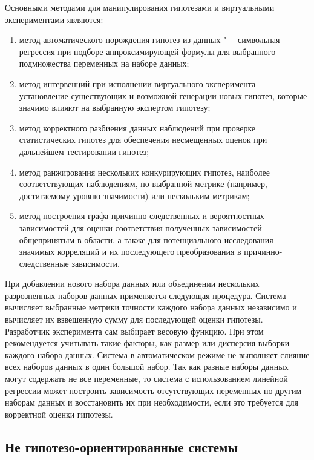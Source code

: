 Основными методами для манипулирования гипотезами и виртуальными экспериментами являются:
\begin{enumerate}
    \item метод автоматического порождения гипотез из данных "--- символьная регрессия при подборе аппроксимирующей 
            формулы для выбранного подмножества переменных на наборе данных;
    \item метод интервенций при исполнении виртуального эксперимента - установление существующих и возможной 
            генерации новых гипотез, которые значимо влияют на выбранную экспертом гипотезу;
    \item метод корректного разбиения данных наблюдений при проверке статистических гипотез для обеспечения 
            несмещенных оценок при дальнейшем тестировании гипотез;
    \item метод ранжирования нескольких конкурирующих гипотез, наиболее соответствующих наблюдениям, 
            по выбранной метрике (например, достигаемому уровню значимости) или нескольким метрикам;
    \item метод построения графа причинно-следственных и вероятностных зависимостей для оценки соответствия 
            полученных зависимостей общепринятым в области, а также для потенциального исследования значимых 
            корреляций и их последующего преобразования в причинно-следственные зависимости.
\end{enumerate}

При добавлении нового набора данных или объединении нескольких разрозненных наборов данных применяется следующая 
процедура. Система вычисляет выбранные метрики точности каждого набора данных независимо и вычисляет их взвешенную 
сумму для последующей оценки гипотезы. Разработчик эксперимента сам выбирает весовую функцию. При этом рекомендуется 
учитывать такие факторы, как размер или дисперсия выборки каждого набора данных. Система в автоматическом режиме не 
выполняет слияние всех наборов данных в один большой набор. Так как разные наборы данных могут содержать не все 
переменные, то система с использованием линейной регрессии может построить зависимость отсутствующих переменных по 
другим наборам данных и восстановить их при необходимости, если это требуется для корректной оценки гипотезы.

\subsection{Не гипотезо-ориентированные системы}\label{sect1_3_5}

